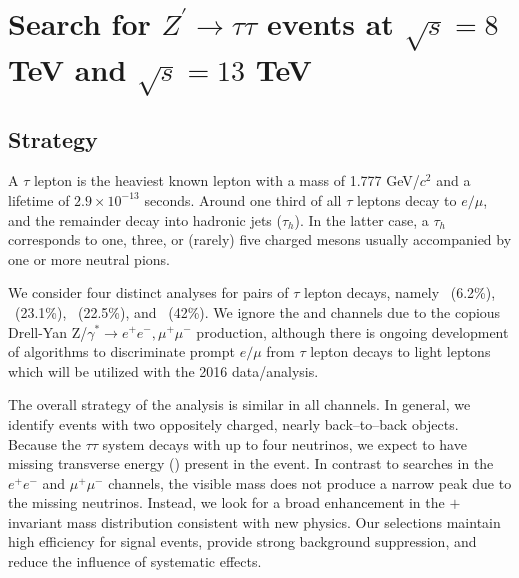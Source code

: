 \chapter{Search for $Z^{\prime}\to\tau\tau$ events at $\sqrt{s} = 8$ TeV and $\sqrt{s} = 13$ TeV}

\section{Strategy}\label{sec:strategy}
A $\tau$ lepton is the heaviest known lepton with a mass of 1.777 GeV/$c^2$ and a lifetime of $2.9\times10^{-13}$ seconds. Around one third of
all $\tau$ leptons decay to $e/\mu$, and the remainder decay into hadronic jets ($\tau_{h}$). 
In the latter case, a $\tau_{h}$ corresponds to one, three, or (rarely) five charged mesons usually accompanied by one or
more neutral pions.

We consider four distinct analyses for pairs of $\tau$ lepton decays, namely \emu ~(6.2\%), \etau ~(23.1\%), \mutau  ~(22.5\%), and
\ditauhad ~(42\%). We ignore the \EE and \MM channels due to the copious Drell-Yan
Z/$\gamma^*\rightarrow e^+e^-, \mu^+\mu^-$ production, although there is ongoing development of algorithms to discriminate prompt $e/\mu$ from $\tau$ lepton 
decays to light leptons which will be utilized with the 2016 data/analysis.

The overall strategy of the analysis is similar in all channels. 
In general, we identify events with two oppositely charged, nearly back--to--back objects. Because the $\tau\tau$ system decays with up to four neutrinos, we expect to have missing transverse energy (\MET) present in the event. In contrast to \zprime  searches in the $e^+e^-$ and $\mu^+\mu^-$ channels, the visible \ditau mass does not produce a narrow peak due to the missing neutrinos. Instead, we look for a broad enhancement in the \ditau$+$\MET  invariant mass distribution consistent with new physics.  Our selections maintain high efficiency for signal events, provide strong background suppression, and reduce the influence of systematic effects.  

